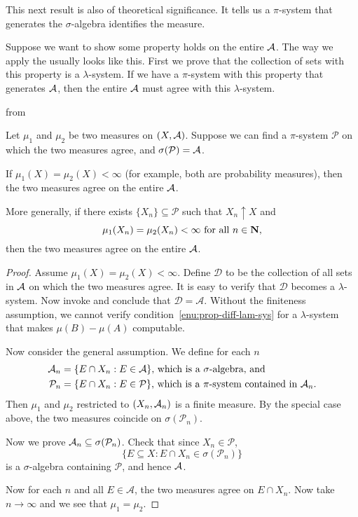 This next result is also of theoretical significance. It tells us a $\pi$-system that generates the $\sigma$-algebra identifies the measure. 

Suppose we want to show some property holds on the entire $\mathcal{A}$. The way we apply the  usually looks like this. First we prove that the collection of sets with this property is a $\lambda$-system. If we have a $\pi$-system with this property that generates $\mathcal{A}$, then the entire $\mathcal{A}$ must agree with this $\lambda$-system.


 from {\cite[Proposition~1.15]{Ambrosio_2011}}

\begin{namedthm} \label{thm:coincidence}
    Let $\mu_1$ and $\mu_2$ be two measures on $(X,\mathcal{A})$. Suppose we can find a $\pi$-system $\mathcal{P}$ on which the two measures agree, and $\sigma(\mathcal{P}) = \mathcal{A}$.

    If $\mu_1(X) = \mu_2(X) < \infty$ (for example, both are probability measures), then the two measures agree on the entire $\mathcal{A}$.

    More generally, if there exists $\{X_n\} \subseteq \mathcal{P}$ such that $X_n \uparrow X$ and \[
        \mu_1(X_n) = \mu_2(X_n) <\infty \text{ for all }n\in \mathbf{N},
    \] then the two measures agree on the entire $\mathcal{A}$.
\end{namedthm}
\begin{proof}
    Assume $\mu_1(X) = \mu_2(X) < \infty$. Define $\mathcal{D}$ to be the collection of all sets in $\mathcal{A}$ on which the two measures agree. It is easy to verify that $\mathcal{D}$ becomes a $\lambda$-system. Now invoke  and conclude that $\mathcal{D} = \mathcal{A}$. Without the finiteness assumption, we cannot verify condition~\ref{enu:prop-diff-lam-sys} for a $\lambda$-system  that makes $\mu(B) - \mu(A)$ computable.

    Now consider the general assumption. We define for each $n$ \begin{align*}
        \mathcal{A}_n & = \{E \cap X_n : E \in \mathcal{A}\}\text{, which is a $\sigma$-algebra, and} \\
        \mathcal{P}_n & = \{E \cap X_n : E \in \mathcal{P}\}\text{, which is a $\pi$-system contained in $\mathcal{A}_n$.}
    \end{align*}
    Then $\mu_1$ and $\mu_2$ restricted to $(X_n,\mathcal{A}_n)$ is a finite measure. By the special case above, the two measures coincide on $\sigma(\mathcal{P}_n)$.

    Now we prove $\mathcal{A}_n \subseteq \sigma(\mathcal{P}_n)$. Check that since $X_n \in \mathcal{P}$, \[
        \{E \subseteq X : E \cap X_n \in \sigma(\mathcal{P}_n)\}
    \] is a $\sigma$-algebra containing $\mathcal{P}$, and hence $\mathcal{A}$.

    Now for each $n$ and all $E \in \mathcal{A}$, the two measures agree on $E \cap X_n$. Now take $n \to \infty$ and we see that $\mu_1 = \mu_2$.
\end{proof}

